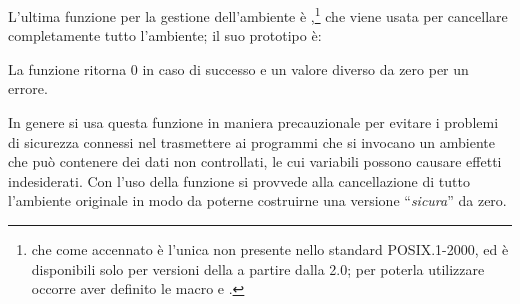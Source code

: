 L'ultima funzione per la gestione dell'ambiente è
,\footnote{che come accennato è l'unica non presente nello
  standard POSIX.1-2000, ed è disponibili solo per versioni della 
  a partire dalla 2.0; per poterla utilizzare occorre aver definito le macro
   e .} che viene usata per
cancellare completamente tutto l'ambiente; il suo prototipo è:

\begin{funcproto}{ 
}
{La funzione ritorna $0$ in caso di successo e un valore diverso da zero per
  un errore.}
\end{funcproto}

In genere si usa questa funzione in maniera precauzionale per evitare i
problemi di sicurezza connessi nel trasmettere ai programmi che si invocano un
ambiente che può contenere dei dati non controllati, le cui variabili possono
causare effetti indesiderati. Con l'uso della funzione si provvede alla
cancellazione di tutto l'ambiente originale in modo da poterne costruirne una
versione ``\textsl{sicura}'' da zero.










